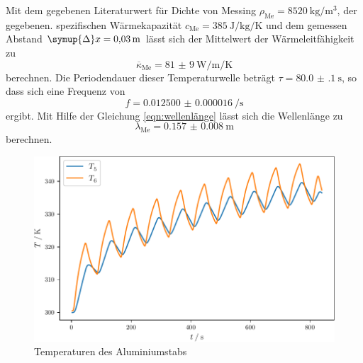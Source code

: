 Mit dem gegebenen Literaturwert für Dichte von Messing $\rho_\text{Me} = \SI{8520}{\kilogram\per\meter\cubed}$, der gegebenen. spezifischen Wärmekapazität 
$c_\text{Me} = \SI{385}{\joule\per\kilogram\per\kelvin}$ und dem gemessen Abstand $\symup{\Delta} x = \SI{0.03}{\meter}$ lässt sich der Mittelwert 
der Wärmeleitfähigkeit zu
\begin{equation}
\overline{\kappa}_\text{Me} = \SI{81(9)}{\watt\per\metre\per\kelvin}
\label{eqn:frequenz}
\end{equation}
berechnen. Die Periodendauer dieser Temperaturwelle beträgt $\tau = \SI{80.0(1)}{\second}$, so dass sich eine Frequenz von
\begin{equation}
  f = \SI{0.012500(16)}{\per\second}
\end{equation}
ergibt. Mit Hilfe der Gleichung \eqref{eqn:wellenlänge}
lässt sich die Wellenlänge zu 
\begin{equation}
  \lambda_\text{Me} = \SI{0.157(8)}{\metre}
\end{equation}
berechnen.
\begin{figure}
  \caption{Temperaturen des Aluminiumstabs}
  \centering
  \includegraphics[width = \textwidth]{build/Al.pdf}
\end{figure}
